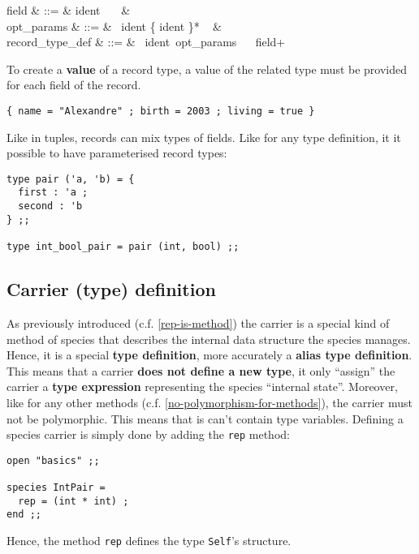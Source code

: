 \vspace{0.2cm}
\begin{syntax}
field & ::= & ident\ \terminal{:}\ \tau\ \terminal{;} & \\
opt\_params & ::= & \epsilon
    \mid \terminal{(}\ ident \{\terminal{,} ident \}*
    \ \terminal{)} & \\
record\_type\_def & ::= &
    \ ident\ opt\_params\  \terminal{=}
    \ \terminal{\{} field+ \terminal{\}}
\end{syntax}
\vspace{0.2cm}

To create a {\bf value} of a record type, a value of the related
type must be provided for each field of the record.
{\scriptsize
\begin{lstlisting}
{ name = "Alexandre" ; birth = 2003 ; living = true }
\end{lstlisting}
}
Like in tuples, records can mix types of fields. Like for any type
definition, it it possible to have parameterised record types:
{\scriptsize
\begin{lstlisting}
type pair ('a, 'b) = {
  first : 'a ;
  second : 'b
} ;;

type int_bool_pair = pair (int, bool) ;;
\end{lstlisting}
}



\subsection{Carrier (type) definition}
As previously introduced (c.f. \ref{rep-is-method}) the carrier is a
special kind of method of species that describes the internal
data structure the species manages. Hence, it is a
special {\bf type definition}, more accurately a
{\bf alias type definition}. This means that a carrier {\bf does not
define a new type}, it only ``assign'' the carrier a {\bf type
expression} representing the species ``internal state''. Moreover,
like for any other methods (c.f. \ref{no-polymorphism-for-methods}),
the carrier must not be polymorphic. This means that is can't contain
type variables. Defining a species carrier is simply done by adding
the {\tt rep} method:
{\scriptsize
\begin{lstlisting}
open "basics" ;;

species IntPair =
  rep = (int * int) ;
end ;;
\end{lstlisting}
}
Hence, the method {\tt rep} defines the type {\tt Self}'s structure.



